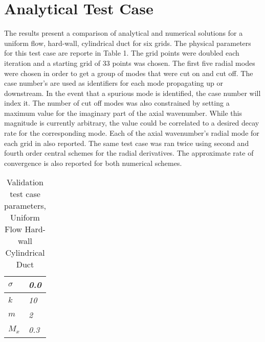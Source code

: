 \documentclass[a4paper]{report}
\begin{document}
 
 
\section{Analytical Test Case}
The results present a comparison of analytical and numerical solutions for a
uniform flow, hard-wall, cylindrical duct for six grids. The physical 
parameters for this test case are reporte in Table 1. The grid points were
doubled each iteration and a starting grid of 33 points was chosen. The 
first five radial modes were chosen in order to get a group of modes that were cut
on and cut off. The case number's are used as identifiers for each 
mode propagating up or downstream. In the event that a spurious mode is identified,
the case number will index it.  The number of cut off modes was also constrained
by setting a maximum value for the imaginary part of the axial wavenumber. 
While this magnitude is currently arbitrary, the value could be correlated to a
desired decay rate for the corresponding mode. Each of the axial wavenumber's 
radial mode for each grid in also reported. The same test case was ran twice using 
second and fourth order central schemes for the radial derivatives.  The 
approximate rate of convergence is also reported for both numerical schemes.
\begin{table}[!h]
    \centering
    \begin{tabular}{|l|l|}
        \hline
        $\sigma$ & \textit{0.0} \\ \hline
        $k$      & \textit{10}   \\ \hline
        $m$      & \textit{2}    \\ \hline
        $M_x$    & \textit{0.3}  \\ \hline
    \end{tabular}
    \caption{Validation test case parameters, Uniform Flow Hard-wall Cylindrical%
    Duct} 
\end{table}
\end{document}
